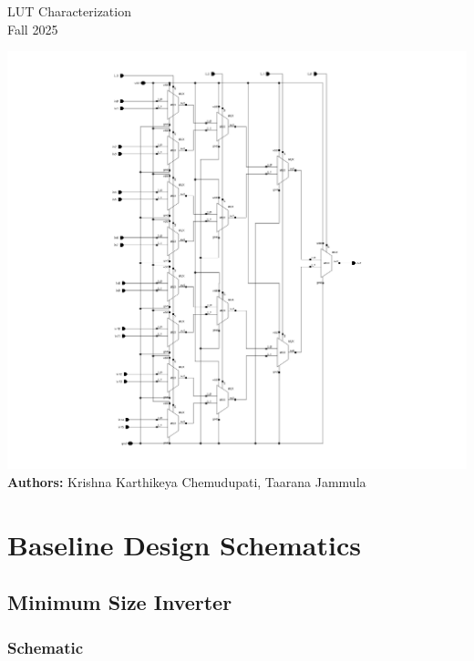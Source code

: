 \documentclass[12pt]{article}
\begin{document}
\begin{titlepage}
    \centering
    \vspace*{0.1cm}
    {\huge LUT Characterization \\[0.5em]}
    {\large Fall 2025 \\[2em]}

    \includegraphics[width=\linewidth]{LUT_sch.png}\\[2em]

    \textbf{Authors:} Krishna Karthikeya Chemudupati, Taarana Jammula \\[2em]

    \vfill
\end{titlepage}

\tableofcontents
\newpage

\section{Baseline Design Schematics}

\subsection{Minimum Size Inverter}

\subsubsection*{Schematic}
\end{document}
